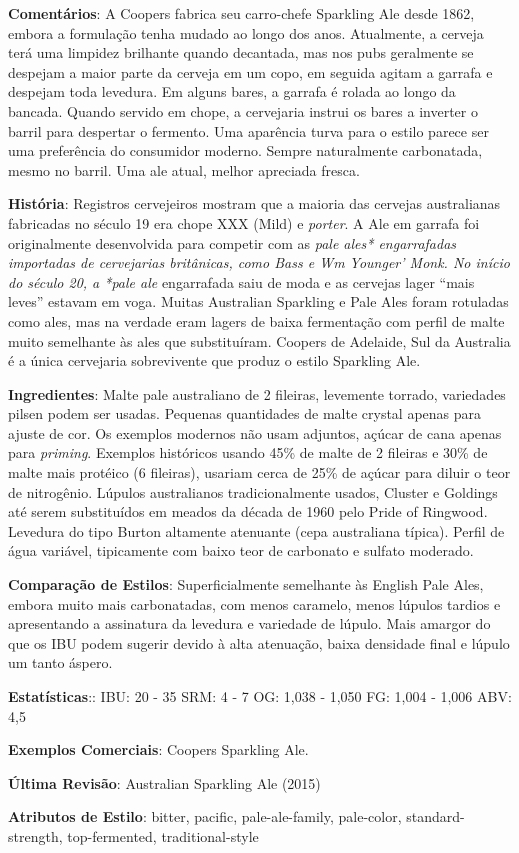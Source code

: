 \textbf{Comentários}: A Coopers fabrica seu carro-chefe Sparkling Ale desde 1862, embora a formulação tenha mudado ao longo dos anos. Atualmente, a cerveja terá uma limpidez brilhante quando decantada, mas nos pubs geralmente se despejam a maior parte da cerveja em um copo, em seguida agitam a garrafa e despejam toda levedura. Em alguns bares, a garrafa é rolada ao longo da bancada. Quando servido em chope, a cervejaria instrui os bares a inverter o barril para despertar o fermento. Uma aparência turva para o estilo parece ser uma preferência do consumidor moderno. Sempre naturalmente carbonatada, mesmo no barril. Uma ale atual, melhor apreciada fresca.

\textbf{História}: Registros cervejeiros mostram que a maioria das cervejas australianas fabricadas no século 19 era chope XXX (Mild) e \textit{porter}. A Ale em garrafa foi originalmente desenvolvida para competir com as \textit{pale ales* engarrafadas importadas de cervejarias britânicas, como Bass e Wm Younger' Monk. No início do século 20, a *pale ale} engarrafada saiu de moda e as cervejas lager “mais leves” estavam em voga. Muitas Australian Sparkling e Pale Ales foram rotuladas como ales, mas na verdade eram lagers de baixa fermentação com perfil de malte muito semelhante às ales que substituíram. Coopers de Adelaide, Sul da Australia é a única cervejaria sobrevivente que produz o estilo Sparkling Ale.

\textbf{Ingredientes}: Malte pale australiano de 2 fileiras, levemente torrado, variedades pilsen podem ser usadas. Pequenas quantidades de malte crystal apenas para ajuste de cor. Os exemplos modernos não usam adjuntos, açúcar de cana apenas para \textit{priming}. Exemplos históricos usando 45\% de malte de 2 fileiras e 30\% de malte mais protéico (6 fileiras), usariam cerca de 25\% de açúcar para diluir o teor de nitrogênio. Lúpulos australianos tradicionalmente usados, Cluster e Goldings até serem substituídos em meados da década de 1960 pelo Pride of Ringwood. Levedura do tipo Burton altamente atenuante (cepa australiana típica). Perfil de água variável, tipicamente com baixo teor de carbonato e sulfato moderado.

\textbf{Comparação de Estilos}: Superficialmente semelhante às English Pale Ales, embora muito mais carbonatadas, com menos caramelo, menos lúpulos tardios e apresentando a assinatura da levedura e variedade de lúpulo. Mais amargor do que os IBU podem sugerir devido à alta atenuação, baixa densidade final e lúpulo um tanto áspero.

\textbf{Estatísticas}:: IBU: 20 - 35
SRM: 4 - 7
OG: 1,038 - 1,050
FG: 1,004 - 1,006
ABV: 4,5%

\textbf{Exemplos Comerciais}: Coopers Sparkling Ale.

\textbf{Última Revisão}: Australian Sparkling Ale (2015)

\textbf{Atributos de Estilo}: bitter, pacific, pale-ale-family, pale-color, standard-strength, top-fermented, traditional-style
